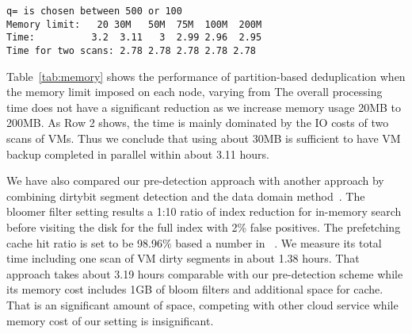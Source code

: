 

\begin{verbatim}
q= is chosen between 500 or 100
Memory limit:   20 30M   50M  75M  100M  200M
Time:          3.2  3.11   3  2.99 2.96  2.95
Time for two scans: 2.78 2.78 2.78 2.78 2.78
\end{verbatim}

Table~\ref{tab:memory} shows the performance of partition-based deduplication when 
the memory limit imposed on each node, varying from 
The overall processing time does not have a significant reduction as we increase memory usage  20MB to 200MB.
As Row 2 shows, the time is mainly dominated by  the IO costs of two scans of VMs.
Thus we conclude that using about 30MB is sufficient to have VM backup completed in parallel within about 3.11 hours.




We have also compared our pre-detection approach with another approach by combining
dirtybit segment  detection and  the data domain method~\cite{Zhu}. 
The bloomer filter setting  results a 1:10 ratio of index reduction for in-memory search before visiting
the disk for the full index with 2\% false positives. The prefetching cache hit ratio is set to be 98.96\% based
a number in ~\cite{Zhu}.
We measure its  total time including one scan of VM dirty segments in about 1.38 hours.
That approach takes about 3.19 hours comparable with our pre-detection scheme while its memory cost
includes 1GB of bloom filters and additional space for cache. That is an significant amount of space,
competing with other cloud service while memory cost of our setting is  insignificant.
 
